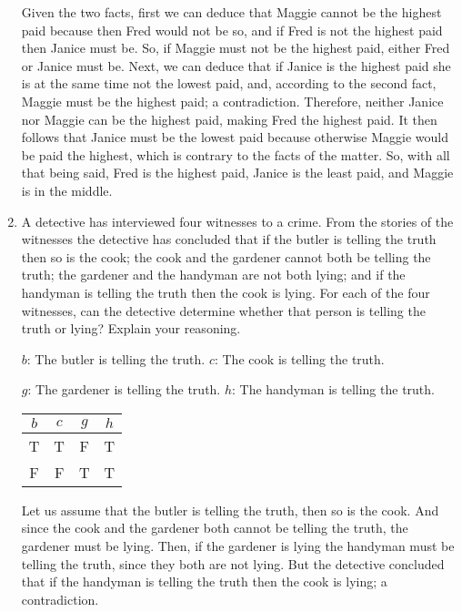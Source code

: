 \documentclass[11pt]{article}
\begin{document}
\begin{enumerate}[label=\textbf{\arabic*.}]
	Given the two facts, first we can deduce that Maggie cannot be the highest paid because then Fred would not be so, and if Fred is not the highest paid then Janice must be. So, if Maggie must not be the highest paid, either Fred or Janice must be. Next, we can deduce that if Janice is the highest paid she is at the same time not the lowest paid, and, according to the second fact, Maggie must be the highest paid; a contradiction. Therefore, neither Janice nor Maggie can be the highest paid, making Fred the highest paid. It then follows that Janice must be the lowest paid because otherwise Maggie would be paid the highest, which is contrary to the facts of the matter. So, with all that being said, Fred is the highest paid, Janice is the least paid, and Maggie is in the middle.
	
	\item A detective has interviewed four witnesses to a crime. From the stories of the witnesses the detective has concluded that if the butler is telling the truth then so is the cook; the cook and the gardener cannot both be telling the truth; the gardener and the handyman are not both lying; and if the handyman is telling the truth then the cook is lying. For each of the four witnesses, can the detective determine whether that person is telling the truth or lying? Explain your reasoning.
	
	\hspace{1em}$b$: The butler is telling the truth.
	\hspace{2.3em}$c$: The cook is telling the truth.
	
	\hspace{1em}$g$: The gardener is telling the truth.
	\hspace{1em}$h$: The handyman is telling the truth.
	
	\begin{tabular}{c | c | c | c}
		$b$ & $c$ & $g$ & $h$ \\
		\hline
		T & T & F & T \\
		F & F & T & T
	\end{tabular}
	
	Let us assume that the butler is telling the truth, then so is the cook. And since the cook and the gardener both cannot be telling the truth, the gardener must be lying. Then, if the gardener is lying the handyman must be telling the truth, since they both are not lying. But the detective concluded that if the handyman is telling the truth then the cook is lying; a contradiction.
	

\end{enumerate}
\end{document}
